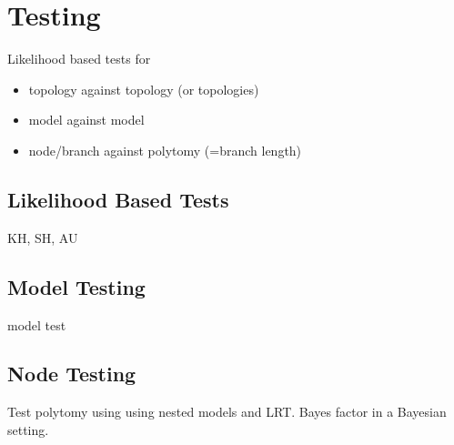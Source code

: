 \section{Testing} \label{sec:testing}

Likelihood based tests for 
\begin{itemize}
 \item topology against topology (or topologies)
 \item model against model
 \item node/branch against polytomy (=branch length)
\end{itemize}

\subsection{Likelihood Based Tests} \label{sec:likelihood-tests}
KH, SH, AU

\subsection{Model Testing} \label{sec:model-test}
model test

\subsection{Node Testing} \label{sec:node-test}
Test polytomy using using nested models and LRT. Bayes factor in a Bayesian setting.